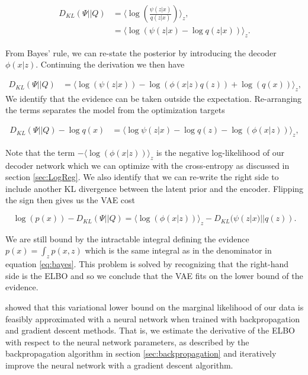 \begin{align}
D_{KL}(\Psi || Q ) &= \langle \log \left(\frac{\psi(z|x)}{q(z|x)}\right) \rangle_z, \\
&= \langle \log \left(\psi(z|x)- \log q(z|x)\right) \rangle_z.
\end{align}

\noindent From Bayes' rule, we can re-state the posterior by introducing the decoder $\phi(x|z)$. Continuing the derivation we then have 

\begin{align}
D_{KL}(\Psi || Q ) &=  \langle \log \left( \psi(z|x)\right)  - \log \left( \phi( x | z) q(z) \right) + \log (q(x))\rangle_z, 
\end{align}
\noindent We identify that the evidence can be taken outside the expectation. Re-arranging the terms separates the model from the optimization targets 

\begin{align}
D_{KL}(\Psi || Q ) - \log q(x) &=  \langle \log \psi(z|x) - \log q(z) - \log \left( \phi( x | z)\right) \rangle_z, 
\end{align}

\noindent Note that the term $-\langle \log \left( \phi( x | z)\right) \rangle_z$ is the negative log-likelihood of our decoder network which we can optimize with the cross-entropy as discussed in section \ref{sec:LogReg}. We also identify that we can re-write the right side to include another KL divergence between the latent prior and the encoder. Flipping the sign then gives us the VAE cost

\begin{equation}\label{eq:vae_cost}
\log(p(x)) - D_{KL}(\Psi || Q )=  \langle \log \left( \phi( x | z)\right) \rangle_z - D_{KL}(\psi(z|x)|| q(z)).
\end{equation}
 
\noindent We are still bound by the intractable integral defining the evidence $p(x) = \int_z p(x, z)$ which is the same integral as in the denominator in equation \ref{eq:bayes}. This problem is solved by recognizing that the right-hand side is the ELBO and so we conclude that the VAE fits on the lower bound of the evidence.

\citet{Kingma2013} showed that this variational lower bound on the marginal likelihood of our data is feasibly approximated with a neural network when trained with backpropagation and gradient descent methods. That is, we estimate the derivative of the ELBO with respect to the neural network parameters, as described by the backpropagation algorithm in section \ref{sec:backpropagation} and iteratively improve the neural network with a gradient descent algorithm.

